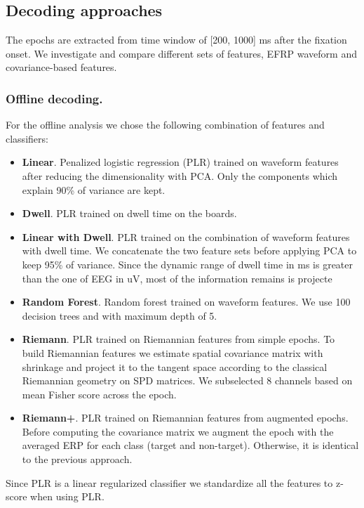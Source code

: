 \documentclass[12pt]{iopart}
\begin{document}
\subsection{Decoding approaches}
The epochs are extracted
from time window of [200, 1000] ms after the fixation onset.
We investigate and compare different sets
of features, EFRP waveform and covariance-based features.

\subsubsection*{Offline decoding.}
For the offline analysis we chose the following combination of features and classifiers:
\begin{itemize}
    \item \textbf{Linear}. Penalized logistic regression (PLR) trained on waveform features after reducing
        the dimensionality with PCA. Only the components which explain 90\% of variance
        are kept. 
    \item \textbf{Dwell}. PLR trained on dwell time on the boards.
    \item \textbf{Linear with Dwell}. PLR trained on the combination of waveform features with dwell time. We concatenate
        the two feature sets before applying PCA to keep 95\% of variance. Since the dynamic
        range of dwell time in ms is greater than the one of EEG in uV, most of the information
        remains is projecte
    \item \textbf{Random Forest}. Random forest trained on waveform features. We use 100 decision trees and
        with maximum depth of 5.
    \item \textbf{Riemann}. PLR trained on Riemannian features from simple epochs.
        To build Riemannian features we
        estimate spatial covariance matrix with shrinkage and project it
        to the tangent space according to the classical Riemannian geometry on SPD matrices.
        We subselected 8 channels based on mean Fisher score across the epoch.
    \item \textbf{Riemann+}. PLR trained on Riemannian features from augmented epochs.
        Before computing the covariance matrix we augment the epoch with the averaged ERP
        for each class (target and non-target). Otherwise, it is identical to the previous
        approach.
\end{itemize}

Since PLR is a linear regularized classifier we standardize all the features to z-score when
using PLR.
\end{document}
